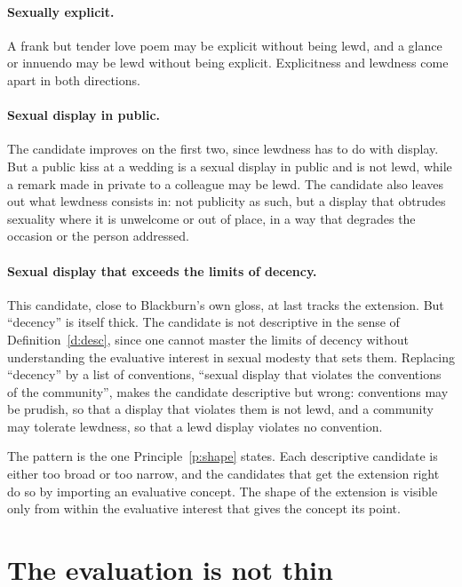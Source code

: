 \documentclass{situationist-preprint}
\begin{document}
\paragraph{Sexually explicit.} A frank but tender love poem may be explicit without being lewd, and a glance or innuendo may be lewd without being explicit. Explicitness and lewdness come apart in both directions.

\paragraph{Sexual display in public.} The candidate improves on the first two, since lewdness has to do with display. But a public kiss at a wedding is a sexual display in public and is not lewd, while a remark made in private to a colleague may be lewd. The candidate also leaves out what lewdness consists in: not publicity as such, but a display that obtrudes sexuality where it is unwelcome or out of place, in a way that degrades the occasion or the person addressed.

\paragraph{Sexual display that exceeds the limits of decency.} This candidate, close to Blackburn's own gloss, at last tracks the extension. But \enquote{decency} is itself thick. The candidate is not descriptive in the sense of Definition~\ref{d:desc}, since one cannot master the limits of decency without understanding the evaluative interest in sexual modesty that sets them. Replacing \enquote{decency} by a list of conventions, \enquote{sexual display that violates the conventions of the community}, makes the candidate descriptive but wrong: conventions may be prudish, so that a display that violates them is not lewd, and a community may tolerate lewdness, so that a lewd display violates no convention.

The pattern is the one Principle~\ref{p:shape} states. Each descriptive candidate is either too broad or too narrow, and the candidates that get the extension right do so by importing an evaluative concept. The shape of the extension is visible only from within the evaluative interest that gives the concept its point.

\section{The evaluation is not thin}
\end{document}
